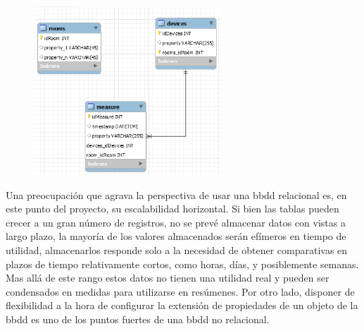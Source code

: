 \begin{figure}[hbt!]
\centering
\includegraphics[height=2.5in]{figures/SQLSchemaExample_3.png}
\end{figure}

Una preocupación que agrava la perspectiva de usar una \gls{bbdd} relacional es, en este punto del proyecto, su escalabilidad horizontal. Si bien las tablas pueden crecer a un gran número de registros, no se prevé almacenar datos con vistas a largo plazo, la mayoría de los valores almacenados serán efímeros en tiempo de utilidad, almacenarlos responde solo a la necesidad de obtener comparativas en plazos de tiempo relativamente cortos, como horas, días, y posiblemente semanas. Mas allá de este rango estos datos no tienen una utilidad real y pueden ser condensados en medidas para utilizarse en resúmenes. Por otro lado, disponer de flexibilidad a la hora de configurar la extensión de propiedades de un objeto de la \gls{bbdd} es uno de los puntos fuertes de una \gls{bbdd} no relacional.
